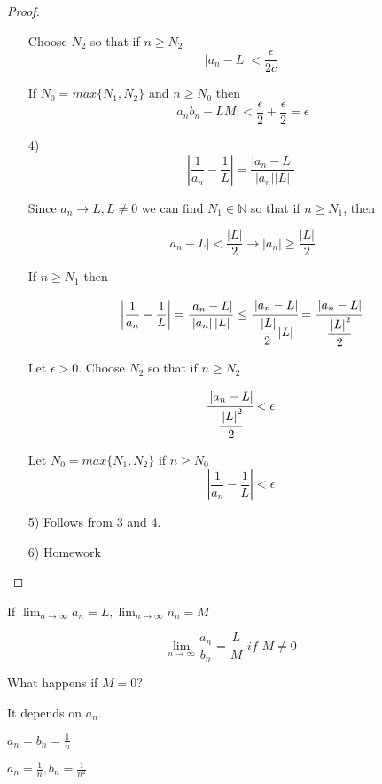 \begin{proof}
\begin{enumerate}
Choose $N_2$ so that if $n\geq N_2$ \[\left| a_n - L \right| < \frac{\epsilon}{2c}\]

If $N_0 = max\{N_1,N_2\}$ and $n\geq N_0$ then \[\left| a_nb_n - LM \right| < \frac{\epsilon}{2} + \frac{\epsilon}{2} = \epsilon \]


\item[4)] 
\[
\left| \frac{1}{a_n} - \frac{1}{L} \right| = \frac{\left| a_n-L \right| }{\left| a_n \right| \left| L \right|  } 
\]

Since $a_n \to L,L\neq 0$ we can find $N_1 \in \mathbb{N}$ so that if $n\geq N_1$, then

\[
\left| a_n - L \right|  < \frac{\left| L \right| }{2} \to \left| a_n \right| \geq \frac{\left| L  \right| }{2}
\]

If $n\geq N_1$ then 

\[
\left| \frac{1}{a_n} - \frac{1}{L} \right| = \frac{\left| a_n-L \right| }{\left| a_n \right| \left| L \right|} \leq \cfrac{\left| a_n - L \right| }{\cfrac{\left| L \right| }{2} \left| L \right|} = \cfrac{\left| a_n - L \right| }{\cfrac{\left| L \right| ^2}{2}}
\]

Let $\epsilon > 0$. Choose $N_2$ so that if $n\geq N_2$

\[
 \cfrac{\left| a_n - L \right| }{\cfrac{\left| L \right| ^2}{2}} < \epsilon
\]

Let $N_0 = max\{N_1,N_2\}$ if $n\geq N_0$
\[
\left| \frac{1}{a_n} - \frac{1}{L} \right| < \epsilon
\]


\item[5)] Follows from 3 and 4. 

\item[6)] Homework
\end{enumerate}
\end{proof}


\begin{note}
If $\lim_{n\to\infty} a_n = L,\lim_{n\to\infty} n_n = M$

\[
\lim_{n\to\infty} \frac{a_n}{b_n}= \frac{L}{M} \textit{ if } M\neq 0
\]

What happens if $M = 0$?


It depends on $a_n$.
\end{note}

\begin{exmp}
$\displaystyle a_n = b_n = \frac{1}{n}$
\end{exmp}

\begin{exmp}
$\displaystyle a_n = \frac{1}{n} , b_n = \frac{1}{n^2}$
\end{exmp}

